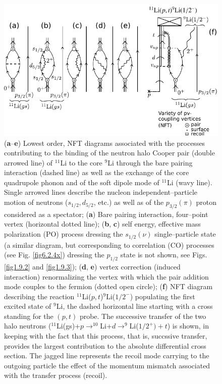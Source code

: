           \begin{figure}
          \centerline {
          \includegraphics*[width=12cm]{introduccion/figs/figintro5xx}
          }
          \caption{(\textbf{a}--\textbf{e}) Lowest order, NFT diagrams associated with the processes contributing  to the binding of the neutron halo Cooper pair (double arrowed line) of $^{11}$Li to the core $^9$Li through the bare pairing interaction (dashed line) as well as the  exchange of the core quadrupole phonon and of the soft dipole mode of $^{11}$Li (wavy line). Single arrowed lines describe the nucleon independent--particle motion of neutrons ($s_{1/2},d_{5/2}$, etc.) as well as of the $p_{3/2}(\pi)$ proton considered as a spectator;  (\textbf{a}) Bare pairing interaction, four--point vertex (horizontal dotted line); (\textbf{b}, \textbf{c}) self energy, effective mass polarization (PO) process dressing the $s_{1/2}(\nu)$ single--particle state (a similar diagram, but corresponding to correlation (CO) processes (see Fig. \ref{fig6.2.4x}) dressing the $p_{1/2}$ state is not shown, see Figs. \ref{fig1.9.2} and \ref{fig1.9.3}); (\textbf{d}, \textbf{e}) vertex correction (induced interaction) renormalizing the  vertex with which the pair addition mode couples to the fermion (dotted open circle); (\textbf{f}) NFT diagram describing the reaction $^{11}$Li($p,t$)$^9$Li($1/2^-$) populating the first excited state of $^9$Li, the dashed horizontal line starting with a cross standing for the $(p,t)$ probe. The successive transfer of the two halo neutrons ($^{11}$Li(gs)+$p\rightarrow^{10}$Li+$d\rightarrow^9$Li($1/2^+)+t$) is shown, in keeping with the fact that this process, that is, succssive transfer, provides the largest contribution to the absolute differential cross section. The jagged line represents the recoil mode carrying  to the outgoing particle the effect of the momentum mismatch associated with the transfer process (recoil).}
          \label{figintro5}
          \end{figure}
